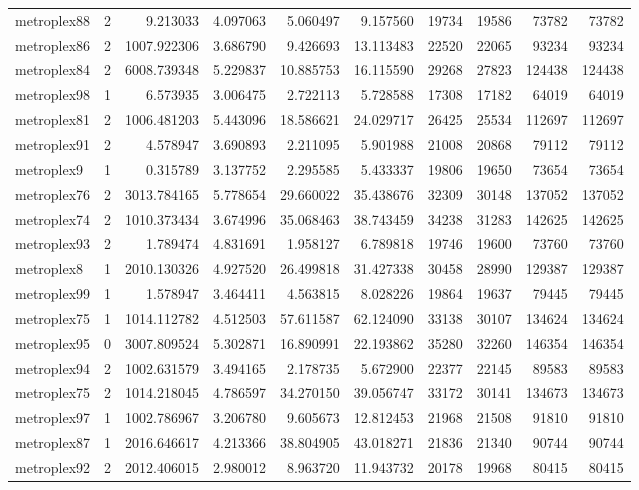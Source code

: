 \begin{longtable}{|l|r|r|r|r|r|r|r|r|r|}
metroplex88 & 2 & 9.213033 & 4.097063 & 5.060497 & 9.157560 & 19734 & 19586 & 73782 & 73782 \\
metroplex86 & 2 & 1007.922306 & 3.686790 & 9.426693 & 13.113483 & 22520 & 22065 & 93234 & 93234 \\
metroplex84 & 2 & 6008.739348 & 5.229837 & 10.885753 & 16.115590 & 29268 & 27823 & 124438 & 124438 \\
metroplex98 & 1 & 6.573935 & 3.006475 & 2.722113 & 5.728588 & 17308 & 17182 & 64019 & 64019 \\
metroplex81 & 2 & 1006.481203 & 5.443096 & 18.586621 & 24.029717 & 26425 & 25534 & 112697 & 112697 \\
metroplex91 & 2 & 4.578947 & 3.690893 & 2.211095 & 5.901988 & 21008 & 20868 & 79112 & 79112 \\
metroplex9 & 1 & 0.315789 & 3.137752 & 2.295585 & 5.433337 & 19806 & 19650 & 73654 & 73654 \\
metroplex76 & 2 & 3013.784165 & 5.778654 & 29.660022 & 35.438676 & 32309 & 30148 & 137052 & 137052 \\
metroplex74 & 2 & 1010.373434 & 3.674996 & 35.068463 & 38.743459 & 34238 & 31283 & 142625 & 142625 \\
metroplex93 & 2 & 1.789474 & 4.831691 & 1.958127 & 6.789818 & 19746 & 19600 & 73760 & 73760 \\
metroplex8 & 1 & 2010.130326 & 4.927520 & 26.499818 & 31.427338 & 30458 & 28990 & 129387 & 129387 \\
metroplex99 & 1 & 1.578947 & 3.464411 & 4.563815 & 8.028226 & 19864 & 19637 & 79445 & 79445 \\
metroplex75 & 1 & 1014.112782 & 4.512503 & 57.611587 & 62.124090 & 33138 & 30107 & 134624 & 134624 \\
metroplex95 & 0 & 3007.809524 & 5.302871 & 16.890991 & 22.193862 & 35280 & 32260 & 146354 & 146354 \\
metroplex94 & 2 & 1002.631579 & 3.494165 & 2.178735 & 5.672900 & 22377 & 22145 & 89583 & 89583 \\
metroplex75 & 2 & 1014.218045 & 4.786597 & 34.270150 & 39.056747 & 33172 & 30141 & 134673 & 134673 \\
metroplex97 & 1 & 1002.786967 & 3.206780 & 9.605673 & 12.812453 & 21968 & 21508 & 91810 & 91810 \\
metroplex87 & 1 & 2016.646617 & 4.213366 & 38.804905 & 43.018271 & 21836 & 21340 & 90744 & 90744 \\
metroplex92 & 2 & 2012.406015 & 2.980012 & 8.963720 & 11.943732 & 20178 & 19968 & 80415 & 80415 \\

\end{longtable}
